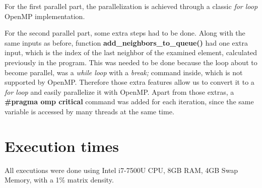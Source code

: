 \documentclass[letterpaper,12pt]{article}
\begin{document}
\leavevmode\newline
For the first parallel part, the parallelization is achieved through a classic \textit{for loop} OpenMP implementation.

\leavevmode\newline
For the second parallel part, some extra steps had to be done. Along with the same inputs as before, function \textbf{add\_neighbors\_to\_queue()} had one extra input, which is the index of the last neighbor of the examined element, calculated previously in the program. This was needed to be done because the loop about to become parallel, was a \textit{while loop} with a \textit{break;} command inside, which is not supported by OpenMP. Therefore those extra features allow us to convert it to a \textit{for loop} and easily parallelize it with OpenMP. Apart from those extras, a \textbf{\#pragma omp critical} command was added for each iteration, since the same variable is accessed by many threads at the same time.

\section{Execution times}

All executions were done using Intel i7-7500U CPU, 8GB RAM, 4GB Swap Memory, with a 1\% matrix density.
\end{document}
